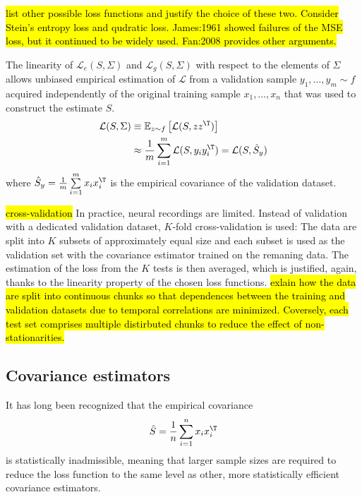 \hl{\tiny list other possible loss functions and justify the choice of these two. Consider Stein's entropy loss and qudratic loss.   James:1961 showed failures of the MSE loss, but it continued to be widely used. Fan:2008 provides other arguments.}


The linearity of $\mathcal L_e(S,\Sigma)$ and $\mathcal L_g(S,\Sigma)$ with respect to the elements of $\Sigma$ allows unbiased empirical estimation of $\mathcal L$ from a validation sample $y_1,\ldots,y_m \sim f$ acquired independently of the original training sample $x_1,\ldots,x_n$ that was used to construct the estimate $S$.
\begin{equation}
\begin{split}
\mathcal L(S,\Sigma) & \equiv \mathbb E_{z\sim f} \left[ \mathcal L(S,zz^\T) \right] \\ 
&\approx \frac 1 m \sum\limits_{i=1}^m \mathcal L(S,y_i y_i^\T) = \mathcal L(S,\hat S_y)
\end{split}
\end{equation}
where $\hat S_y = \frac 1 m \sum\limits_{i=1}^m x_i x_i^\T$ is the empirical covariance of the validation dataset. 

\hl{\tiny cross-validation}
In practice, neural recordings are limited.   Instead of validation with a dedicated validation dataset, $K$-fold cross-validation is used: The data are split into $K$ subsets of approximately equal size and each subset is used as the validation set with the covariance estimator trained on the remaning data.  The estimation of the loss from the $K$ tests is then averaged, which is justified, again, thanks to the linearity property of the chosen loss functions. 
\hl{\tiny exlain how the data are split into continuous chunks so that dependences between the training and validation datasets due to temporal correlations are minimized.  Coversely, each test set comprises multiple distirbuted chunks to reduce the effect of non-stationarities.}
 
 
\subsection*{Covariance estimators}
It has long been recognized that the empirical covariance 
\begin{equation}
\hat S = \frac 1 n \sum\limits_{i=1}^n x_i x_i^\T
\end{equation}
is statistically inadmissible, meaning that larger sample sizes are required to reduce the loss function to the same level as other, more statistically efficient covariance estimators. 

